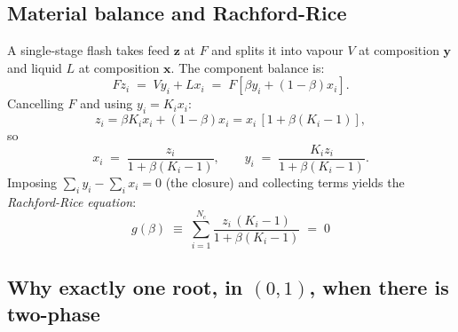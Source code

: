 \documentclass[11pt,a4paper]{article}
\newcommand{\xv}{\mathbf{x}}
\newcommand{\yv}{\mathbf{y}}
\newcommand{\zv}{\mathbf{z}}
\begin{document}
\subsection{Material balance and Rachford-Rice}

A single-stage flash takes feed $\zv$ at $F$ and splits it into
vapour $V$ at composition $\yv$ and liquid $L$ at composition $\xv$.
The component balance is:
\begin{equation}
   F z_i \;=\; V y_i + L x_i \;=\; F[\beta y_i + (1-\beta) x_i].
\end{equation}
Cancelling $F$ and using $y_i = K_i x_i$:
\[
   z_i = \beta K_i x_i + (1-\beta) x_i = x_i\,[1 + \beta(K_i - 1)],
\]
so
\begin{equation}
   x_i \;=\; \frac{z_i}{1 + \beta(K_i - 1)},
   \qquad
   y_i \;=\; \frac{K_i z_i}{1 + \beta(K_i - 1)}.
   \label{eq:xy-from-K}
\end{equation}
Imposing $\sum_i y_i - \sum_i x_i = 0$ (the closure) and collecting
terms yields the \emph{Rachford-Rice equation}:
\begin{equation}
   \boxed{\;
   g(\beta) \;\equiv\; \sum_{i=1}^{N_c} \frac{z_i \, (K_i - 1)}{1 + \beta(K_i - 1)} \;=\; 0
   \;}
   \label{eq:RR}
\end{equation}

\subsection{Why exactly one root, in $(0, 1)$, when there is two-phase}
\end{document}
